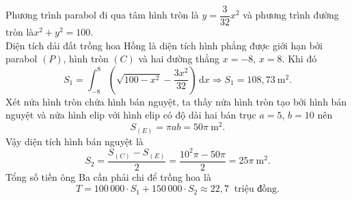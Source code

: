 \begin{bt}
{\begin{center}
		\end{center}Phương trình parabol đi qua tâm hình tròn là $y = \dfrac{3}{32} x^2$ và phương trình đường tròn là\break $x^2 + y^2 = 100$.\\
		Diện tích dải đất trồng hoa Hồng là diện tích hình phẳng được giới hạn bởi  parabol $(P)$, hình tròn $(C)$ và hai đường thẳng $x = -8$, $x = 8$. Khi đó
		$$S_1 = \displaystyle\int_{-8}^{8} \left(\sqrt{100 - x^2} -  \dfrac{3x^2}{32} \right) \mathrm{\,d}x \Rightarrow S_1 = 108{,}73~\mathrm{m}^2.$$
		Xét nửa hình tròn chứa hình bán nguyệt, ta thấy nửa hình tròn tạo bởi hình bán nguyệt và nửa hình elip với hình elip có độ dài hai bán trục $a = 5$, $b  = 10$ nên $$S_{(E) } = \pi ab = 50 \pi~ \mathrm{m}^2.$$
		Vậy diện tích hình bán  nguyệt là $$S_2 = \dfrac{S_{(C) } - S_{(E)}}{2} = \dfrac{10^2 \pi - 50 \pi}{2} = 25 \pi~ \mathrm{m}^2.$$
	Tổng số  tiền ông Ba cần phải chi để trồng hoa là $$T=100\,000\cdot S_1+150\,000\cdot S_2\approx22{,}7~\text{ triệu đồng}.$$}
\end{bt}

